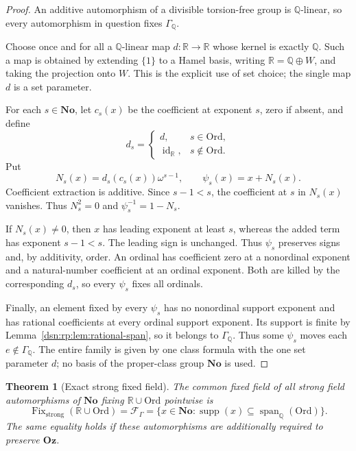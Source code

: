 \documentclass[11pt,a4paper]{article}
\numberwithin{equation}{section}
\newtheorem{theorem}{Theorem}[section]
\theoremstyle{definition}
\theoremstyle{remark}
\newcommand{\No}{\mathbf{No}}
\newcommand{\Oz}{\mathbf{Oz}}
\newcommand{\Ord}{\mathrm{Ord}}
\newcommand{\Q}{\mathbb Q}
\newcommand{\R}{\mathbb R}
\newcommand{\supp}{\operatorname{supp}}
\begin{document}
\begin{proof}
An additive automorphism of a divisible torsion-free group is
\(\Q\)-linear, so every automorphism in question fixes \(\Gamma_{\Q}\).

Choose once and for all a \(\Q\)-linear map \(d:\R\to\R\) whose
kernel is exactly \(\Q\). Such a map is obtained by extending
\(\{1\}\) to a Hamel basis, writing \(\R=\Q\oplus W\), and taking
the projection onto \(W\). This is the explicit use of set choice;
the single map \(d\) is a set parameter.

For each \(s\in\No\), let \(c_s(x)\) be the coefficient at exponent
\(s\), zero if absent, and define
\[
 d_s=\begin{cases}d,&s\in\Ord,\\
                   \operatorname{id}_{\R},&s\notin\Ord.
      \end{cases}
\]
Put
\begin{equation}\label{dsn:rp:eq:shear}
 N_s(x)=d_s(c_s(x))\omega^{s-1},\qquad
 \psi_s(x)=x+N_s(x).
\end{equation}
Coefficient extraction is additive. Since \(s-1<s\), the
coefficient at \(s\) in \(N_s(x)\) vanishes. Thus \(N_s^2=0\) and
\(\psi_s^{-1}=1-N_s\).

If \(N_s(x)\ne0\), then \(x\) has leading exponent at least
\(s\), whereas the added term has exponent \(s-1<s\).
The leading sign is unchanged. Thus \(\psi_s\) preserves signs
and, by additivity, order.
An ordinal has coefficient zero at a nonordinal exponent and a
natural-number coefficient at an ordinal exponent. Both are killed
by the corresponding \(d_s\), so every \(\psi_s\) fixes all ordinals.

Finally, an element fixed by every \(\psi_s\) has no nonordinal
support exponent and has rational coefficients at every ordinal
support exponent. Its support is finite by
Lemma~\ref{dsn:rp:lem:rational-span}, so it belongs to \(\Gamma_{\Q}\).
Thus some \(\psi_s\) moves each \(e\notin \Gamma_{\Q}\).
The entire family is given by one class formula with the one set
parameter \(d\); no basis of the proper-class group \(\No\) is used.
\end{proof}

\begin{theorem}[Exact strong fixed field]\label{dsn:rp:thm:strong-fixed}
The common fixed field of all strong field automorphisms of \(\No\)
fixing \(\R\cup\Ord\) pointwise is
\begin{equation}\label{dsn:rp:eq:strong-fixed}
 \operatorname{Fix}_{\mathrm{strong}}(\R\cup\Ord)
    =\mathcal F_\Gamma
    =\{x\in\No:\supp(x)\subseteq\operatorname{span}_{\Q}(\Ord)\}.
\end{equation}
The same equality holds if these automorphisms are additionally
required to preserve \(\Oz\).
\end{theorem}
\end{document}
